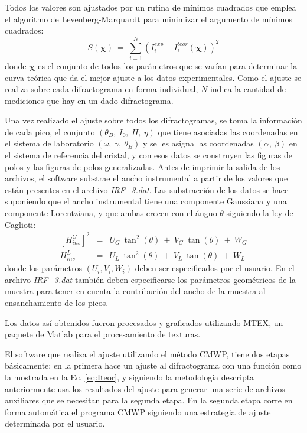 Todos los valores son ajustados por un rutina de mínimos cuadrados que emplea el algoritmo de Levenberg-Marquardt\cite{wiki:Levenberg} para minimizar el argumento de mínimos cuadrados:
\begin{equation}
  S(\mathbf{\chi}) \ = \ \sum_{i=1}^{N} (I^{exp}_i - I^{teor}_i(\mathbf{\chi}))^2
  \label{eq:argmin}
\end{equation}
\noindent
donde $\mathbf{\chi}$ es el conjunto de todos los parámetros que se varían para determinar la curva teórica que da el mejor ajuste a los datos experimentales.
Como el ajuste se realiza sobre cada difractograma en forma individual, $N$ indica la cantidad de mediciones que hay en un dado difractograma.

Una vez realizado el ajuste sobre todos los difractogramas, se toma la información de cada pico, el conjunto $(\theta_B, \ I_0, \ H, \ \eta)$ que tiene asociadas las coordenadas en el sistema de laboratorio $(\omega, \ \gamma, \ \theta_B)$ y se les asigna las coordenadas  $(\alpha, \ \beta)$ en el sistema de referencia del cristal, y con esos datos se construyen las figuras de polos y las figuras de polos generalizadas.
Antes de imprimir la salida de los archivos, el software substrae el ancho instrumental a partir de los valores que están presentes en el archivo \textit{IRF\_3.dat}.
Las substracción de los datos se hace suponiendo que el ancho instrumental tiene una componente Gaussiana y una componente Lorentziana, y que ambas crecen con el ánguo $\theta$ siguiendo la ley de Caglioti\cite{Caglioti1958}:
\begin{eqnarray}
  \left[H_{ins}^{G}\right]^2 & = & U_G \ \tan^2(\theta) \ + \ V_G \ \tan(\theta) \ + \ W_G \\
  H_{ins}^{L} & = & U_L \ \tan^2(\theta) \ + \ V_L \ \tan(\theta) \ + \ W_L
  \label{eq:caglioti}
\end{eqnarray}
\noindent
donde los parámetros $(U_i, V_i, W_i)$ deben ser especificados por el usuario.
En el archivo \textit{IRF\_3.dat} también deben especificarse los parámetros geométricos de la muestra para tener en cuenta la contribución del ancho de la muestra al ensanchamiento de los picos.

Los datos así obtenidos fueron procesados y graficados utilizando MTEX\cite{Hielscher2008}, un paquete de Matlab para el procesamiento de texturas.

El software que realiza el ajuste utilizando el método CMWP, tiene dos etapas básicamente: en la primera hace un ajuste al difractograma con una función como la mostrada en la Ec. \ref{eq:Iteor}, y siguiendo la metodología descripta anteriormente usa los resultados del ajuste para generar una serie de archivos auxiliares que se necesitan para la segunda etapa.
En la segunda etapa corre en forma automática el programa CMWP siguiendo una estrategia de ajuste determinada por el usuario.

